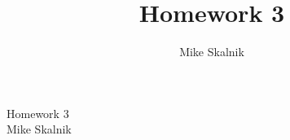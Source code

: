 \documentclass[12pt]{article}
\title{Homework 3}
\author{Mike Skalnik}
\begin{document}
\begin{flushright}{\large Homework 3\\ Mike Skalnik}\end{flushright}

\begin{enumerate}
\end{enumerate}
\end{document}
